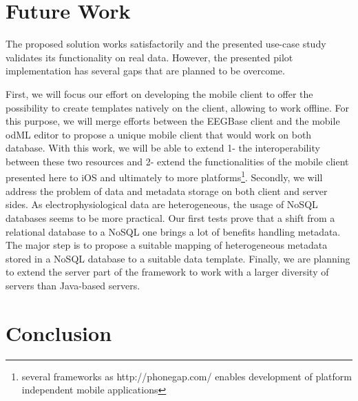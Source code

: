 \documentclass[a4paper,twoside]{article}
\begin{document}

\section{Future Work}

The proposed solution works satisfactorily and the presented use-case study validates its functionality on real data. However, the presented pilot implementation has several gaps that are planned to be overcome.

First, we will focus our effort on developing the mobile client to offer the possibility to create templates natively on the client, allowing to work offline. For this purpose, we will merge efforts between the EEGBase client and the mobile odML editor \cite{10.3389/conf.fninf.2014.18.00053} to propose a unique mobile client that would work on both database. With this work, we will be able to extend 1- the interoperability between these two resources and 2- extend the functionalities of the mobile client presented here to iOS and ultimately to more platforms\footnote{several frameworks as http://phonegap.com/ enables development of platform independent mobile applications}.
Secondly, we will address the problem of data and metadata storage on both client and server sides. As electrophysiological data are heterogeneous, the usage of NoSQL databases seems to be more practical. Our first tests prove \cite{Jezek2014422} that a shift from a relational database to a NoSQL one brings a lot of benefits handling metadata. The major step is to propose a suitable mapping of heterogeneous metadata stored in a NoSQL database to a suitable data template. Finally, we are planning to extend the server part of the framework to work with a larger diversity of servers than Java-based servers.



\section{Conclusion}
\end{document}
